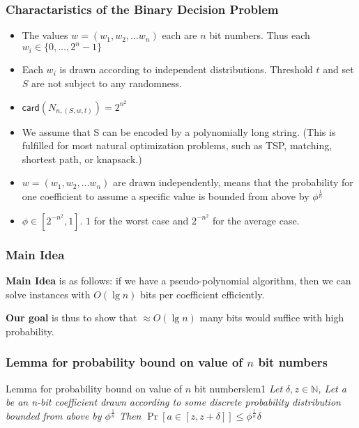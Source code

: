 \begin{frame}
    \frametitle{Charactaristics of the Binary Decision Problem}

    \begin{itemize}
        \item The values $w = (w_1, w_2, \dots w_n)$ each are $n$ bit numbers. Thus each $w_i
                  \in \{0, \dots, 2^n - 1\}$
        \item Each $w_i$ is drawn according to independent distributions. Threshold $t$ and
              set $S$ are not subject to any randomness.
        \item $\textsf{card}(N_{n, (S, w, t)}) = 2^{n^2}$
        \item We assume that S can be encoded by a polynomially long string. (This is
              fulfilled for most natural optimization problems, such as TSP, matching,
              shortest path, or knapsack.)
        \item $w = (w_1, w_2, \dots w_n)$ are drawn independently, means that the probability for one coefficient to assume a specific value is bounded from above by $\phi^{\frac{1}{n}}$
        \item $\phi \in [2^{-n^2}, 1]$. $1$ for the worst case and $2^{-n^2}$ for the average case.
    \end{itemize}

\end{frame}

\begin{frame}
    \frametitle{Main Idea}

    \textbf{Main Idea} is as follows: if we have a pseudo-polynomial algorithm, then we can solve instances with
    $O(\lg n)$ bits per coefficient efficiently.

    \textbf{Our goal} is thus to show that $\approx O(\lg n)$ many bits
    would suffice with high probability.

\end{frame}

\begin{frame}
    \frametitle{Lemma for probability bound on value of $n$ bit numbers}

    \begin{lemm}{Lemma for probability bound on value of $n$ bit numbers}{lem1}
        \textit{Let $\delta, z \in \mathbb{N}$, Let a be an n-bit coefficient drawn according to some discrete
            probability distribution bounded from above by $\phi ^{\frac{1}{n}}$
            Then $\Pr[a \in [z, z + \delta]] \leq \phi ^{\frac{1}{n}} \delta$}
    \end{lemm}

\end{frame}

